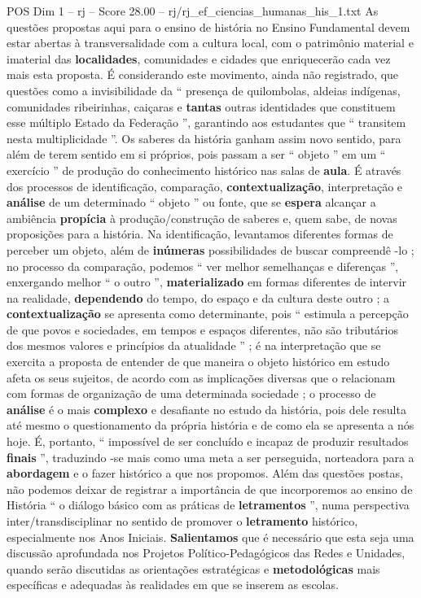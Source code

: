 \begin{textsample}{POS Dim 1 – rj – Score 28.00 – rj/rj\_ef\_ciencias\_humanas\_his\_1.txt}
As questões propostas aqui para o ensino de história no Ensino Fundamental devem estar abertas à transversalidade com a cultura local, com o patrimônio material e imaterial das \textbf{localidades}, comunidades e cidades que enriquecerão cada vez mais esta proposta.
É considerando este movimento, ainda não registrado, que questões como a invisibilidade da “ presença de quilombolas, aldeias indígenas, comunidades ribeirinhas, caiçaras e \textbf{tantas} outras identidades que constituem esse múltiplo Estado da Federação ”, garantindo aos estudantes que “ transitem nesta multiplicidade ”.
Os saberes da história ganham assim novo sentido, para além de terem sentido em si próprios, pois passam a ser “ objeto ” em um “ exercício ” de produção do conhecimento histórico nas salas de \textbf{aula}.
É através dos processos de identificação, comparação, \textbf{contextualização}, interpretação e \textbf{análise} de um determinado “ objeto ” ou fonte, que se \textbf{espera} alcançar a ambiência \textbf{propícia} à produção/construção de saberes e, quem sabe, de novas proposições para a história.
Na identificação, levantamos diferentes formas de perceber um objeto, além de \textbf{inúmeras} possibilidades de buscar compreendê -lo ; no processo da comparação, podemos “ ver melhor semelhanças e diferenças ”, enxergando melhor “ o outro ”, \textbf{materializado} em formas diferentes de intervir na realidade, \textbf{dependendo} do tempo, do espaço e da cultura deste outro ; a \textbf{contextualização} se apresenta como determinante, pois “ estimula a percepção de que povos e sociedades, em tempos e espaços diferentes, não são tributários dos mesmos valores e princípios da atualidade ” ; é na interpretação que se exercita a proposta de entender de que maneira o objeto histórico em estudo afeta os seus sujeitos, de acordo com as implicações diversas que o relacionam com formas de organização de uma determinada sociedade ; o processo de \textbf{análise} é o mais \textbf{complexo} e desafiante no estudo da história, pois dele resulta até mesmo o questionamento da própria história e de como ela se apresenta a nós hoje.
É, portanto, “ impossível de ser concluído e incapaz de produzir resultados \textbf{finais} ”, traduzindo -se mais como uma meta a ser perseguida, norteadora para a \textbf{abordagem} e o fazer histórico a que nos propomos.
Além das questões postas, não podemos deixar de registrar a importância de que incorporemos ao ensino de História “ o diálogo básico com as práticas de \textbf{letramentos} ”, numa perspectiva inter/transdisciplinar no sentido de promover o \textbf{letramento} histórico, especialmente nos Anos Iniciais. \textbf{Salientamos} que é necessário que esta seja uma discussão aprofundada nos Projetos Político-Pedagógicos das Redes e Unidades, quando serão discutidas as orientações estratégicas e \textbf{metodológicas} mais específicas e adequadas às realidades em que se inserem as escolas.


\end{textsample}
